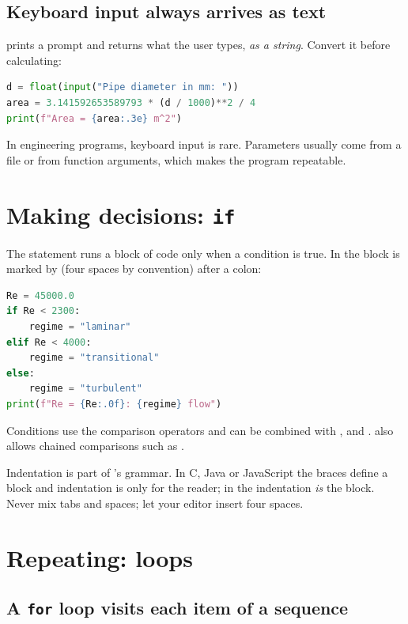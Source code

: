 \subsection*{Keyboard input always arrives as text}

 prints a prompt and returns what the user types, \emph{as a string}. Convert
it before calculating:
\begin{lstlisting}[language=Python]
d = float(input("Pipe diameter in mm: "))
area = 3.141592653589793 * (d / 1000)**2 / 4
print(f"Area = {area:.3e} m^2")
\end{lstlisting}
In engineering programs, keyboard input is rare. Parameters usually come from a file or
from function arguments, which makes the program repeatable.

\section{Making decisions: \texttt{if}}

The  statement runs a block of code only when a condition is true. In \py the
block is marked by  (four spaces by convention) after a colon:
\begin{lstlisting}[language=Python]
Re = 45000.0
if Re < 2300:
    regime = "laminar"
elif Re < 4000:
    regime = "transitional"
else:
    regime = "turbulent"
print(f"Re = {Re:.0f}: {regime} flow")
\end{lstlisting}
Conditions use the comparison operators \code{== != < <= > >=} and can be combined with
,  and . \py also allows chained comparisons such as
.

\begin{keyidea}
Indentation is part of \py's grammar. In C, Java or JavaScript the braces
\code{\{ \}} define a block and indentation is only for the reader; in \py the
indentation \emph{is} the block. Never mix tabs and spaces; let your editor insert four
spaces.
\end{keyidea}

\section{Repeating: loops}

\subsection*{A \texttt{for} loop visits each item of a sequence}

